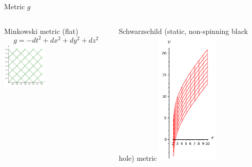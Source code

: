 \documentclass{beamer}
\begin{document}
	\begin{frame}{Metric $g$}
		\begin{columns}
			\begin{column}{0.5\textwidth}
				Minkowski metric (flat)
					\begin{equation*}
						g = -dt^2 + dx^2 + dy^2 + dz^2
					\end{equation*}
			\includegraphics[width=0.4\textwidth]{images/conformal_Minkowskiindex.png}						
			\end{column}
			\begin{column}{0.5\textwidth}  %
				Schwarzschild (static, non-spinning black hole) metric
			\includegraphics[width=0.4\textwidth]{images/SM_Schwarzschild_BoyerLindquistplotindex.png}						
			\end{column}
		\end{columns}
	\end{frame}
\end{document}
